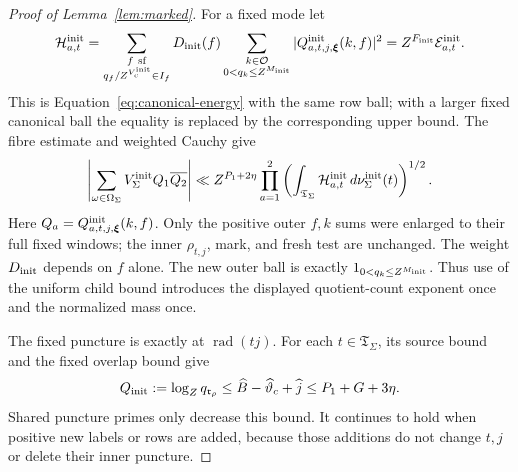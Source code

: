 \documentclass[12pt]{article}
\begin{document}
\begin{proof}[Proof of Lemma~\ref{lem:marked}]
For a fixed mode let
\begin{equation}\label{eq:initial-positive-child}
 \mathcal H_{a,t}^{\rm init}
 =\sum_{\substack{f\ {\rm sf}\\q_f/Z^{V_c^{\rm init}}\in I_f}}
 D_{\rm init}(f)\sum_{\substack{k\in\mathcal O\\0<q_k\le Z^{M_{\rm init}}}}
 |Q^{\rm init}_{a,t,j,\boldsymbol\xi}(k,f)|^2
 =Z^{F_{\rm init}}\mathcal E_{a,t}^{\rm init}.
\end{equation}
This is Equation~\eqref{eq:canonical-energy} with the same row ball;
with a larger fixed canonical ball the equality is replaced by the
corresponding upper bound.  The fibre estimate and weighted Cauchy give
\begin{equation}\label{eq:initial-weighted-count}
 \left|\sum_{\omega\in\Omega_\Sigma}V_\Sigma^{\rm init}Q_1\overline{Q_2}\right|
 \ll Z^{P_1+2\eta}
 \prod_{a=1}^2
 \left(\int_{\mathfrak T_\Sigma}\mathcal H_{a,t}^{\rm init}
                         \,d\nu_\Sigma^{\rm init}(t)\right)^{1/2}.
\end{equation}
Here \(Q_a=Q^{\rm init}_{a,t,j,\boldsymbol\xi}(k,f)\).
Only the positive outer \(f,k\) sums were enlarged to their full
fixed windows; the inner \(\rho_{t,j}\), mark, and fresh test are
unchanged.  The weight \(D_{\rm init}\) depends on \(f\) alone.
The new outer ball is exactly \(1_{0<q_k\le Z^{M_{\rm init}}}\).
Thus use of the uniform child bound introduces the displayed quotient-count
exponent once and the normalized mass once.

The fixed puncture is exactly at \(\operatorname{rad}(tj)\).
For each \(t\in\mathfrak T_\Sigma\), its source bound and the
fixed overlap bound give
\begin{equation}\label{old-eq:4.13}
 Q_{\rm init}:=\log_Zq_{\mathfrak r_\rho}
 \le\widehat B-\widehat\vartheta_c+\widehat j\le P_1+G+3\eta.
\end{equation}
Shared puncture primes only decrease this bound.  It continues to hold
when positive new labels or rows are added, because those additions
do not change \(t,j\) or delete their inner puncture.


\end{proof}
\end{document}
